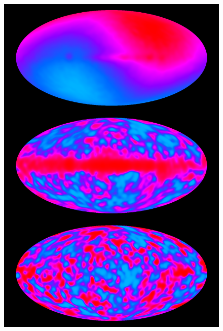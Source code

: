 \documentclass[10pt,a4paper]{article}
\begin{document}
\begin{figure}
\center
\includegraphics[scale=0.15]{COBE_cmb_2}
\caption{} %
\label{cobe}
\end{figure}
\end{document}
